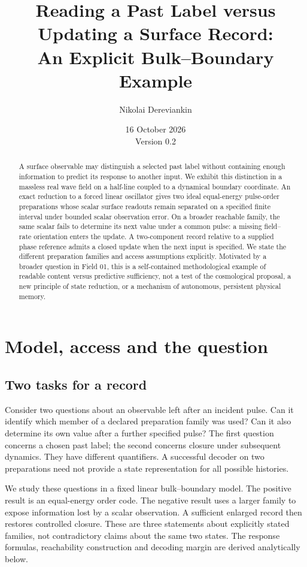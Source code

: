 \documentclass[11pt,a4paper]{article}
\title{Reading a Past Label versus Updating a Surface Record:\\
An Explicit Bulk--Boundary Example}
\author{Nikolai Dereviankin}
\date{16 October 2026\\[0.35em]\small Version 0.2}
\theoremstyle{remark}
\begin{document}
\maketitle
\begin{abstract}
A surface observable may distinguish a selected past label without
containing enough information to predict its response to another input.
We exhibit this distinction in a massless real wave field on a half-line
coupled to a dynamical boundary coordinate. An exact reduction to a
forced linear oscillator gives two ideal equal-energy pulse-order
preparations whose scalar surface readouts remain separated on a specified
finite interval under bounded scalar observation error. On a broader reachable family,
the same scalar fails to determine its next value under a common pulse:
a missing field--rate orientation enters the update. A two-component
record relative to a supplied phase reference admits a closed update
when the next input is specified. We state the different preparation
families and access assumptions explicitly. Motivated by a broader
question in Field 01, this is a self-contained methodological example
of readable content versus predictive sufficiency, not a test of the
cosmological proposal, a new principle of state reduction, or a mechanism
of autonomous, persistent physical memory.
\end{abstract}

\section{Model, access and the question}
\label{sec:model}

\subsection{Two tasks for a record}

Consider two questions about an observable left after an incident pulse.
Can it identify which member of a declared preparation family was used?
Can it also determine its own value after a further specified pulse?
The first question concerns a chosen past label; the second concerns
closure under subsequent dynamics. They have different quantifiers.
A successful decoder on two preparations need not provide a state
representation for all possible histories.

We study these questions in a fixed linear bulk--boundary model.
The positive result is an equal-energy order code. The negative result
uses a larger family to expose information lost by a scalar observation.
A sufficient enlarged record then restores controlled closure. These
are three statements about explicitly stated families, not contradictory
claims about the same two states. The response formulas, reachability
construction and decoding margin are derived analytically below.
\end{document}
